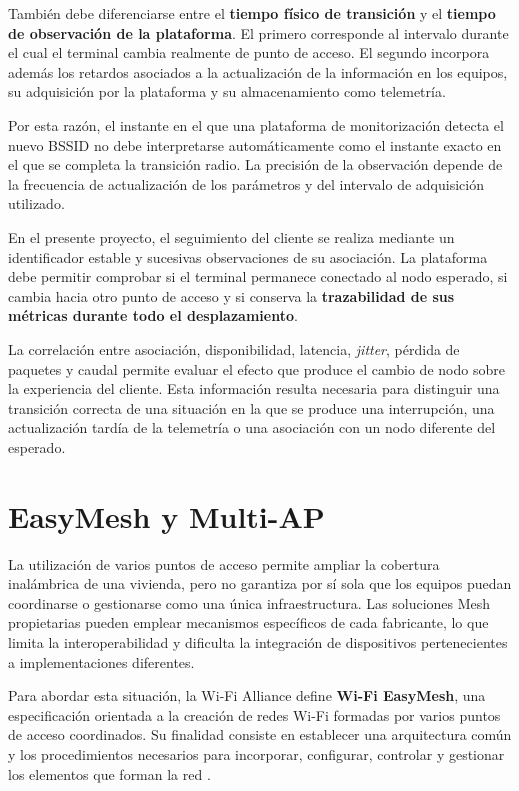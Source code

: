 También debe diferenciarse entre el
\textbf{tiempo físico de transición} y el
\textbf{tiempo de observación de la plataforma}. El primero corresponde
al intervalo durante el cual el terminal cambia realmente de punto de
acceso. El segundo incorpora además los retardos asociados a la
actualización de la información en los equipos, su adquisición por la
plataforma y su almacenamiento como telemetría.

Por esta razón, el instante en el que una plataforma de monitorización
detecta el nuevo BSSID no debe interpretarse automáticamente como el
instante exacto en el que se completa la transición radio. La precisión
de la observación depende de la frecuencia de actualización de los
parámetros y del intervalo de adquisición utilizado.

En el presente proyecto, el seguimiento del cliente se realiza mediante
un identificador estable y sucesivas observaciones de su asociación. La
plataforma debe permitir comprobar si el terminal permanece conectado al
nodo esperado, si cambia hacia otro punto de acceso y si conserva la
\textbf{trazabilidad de sus métricas durante todo el desplazamiento}.

La correlación entre asociación, disponibilidad, latencia,
\textit{jitter}, pérdida de paquetes y caudal permite evaluar el efecto
que produce el cambio de nodo sobre la experiencia del cliente. Esta
información resulta necesaria para distinguir una transición correcta de
una situación en la que se produce una interrupción, una actualización
tardía de la telemetría o una asociación con un nodo diferente del
esperado.

\section{EasyMesh y Multi-AP}
\label{sec:easymesh-multi-ap}

La utilización de varios puntos de acceso permite ampliar la cobertura
inalámbrica de una vivienda, pero no garantiza por sí sola que los equipos
puedan coordinarse o gestionarse como una única infraestructura. Las
soluciones Mesh propietarias pueden emplear mecanismos específicos de
cada fabricante, lo que limita la interoperabilidad y dificulta la
integración de dispositivos pertenecientes a implementaciones
diferentes.

Para abordar esta situación, la Wi-Fi Alliance define
\textbf{Wi-Fi EasyMesh}, una especificación orientada a la creación de
redes Wi-Fi formadas por varios puntos de acceso coordinados. Su finalidad
consiste en establecer una arquitectura común y los procedimientos
necesarios para incorporar, configurar, controlar y gestionar los
elementos que forman la red \cite{wifi_alliance_easymesh}.

